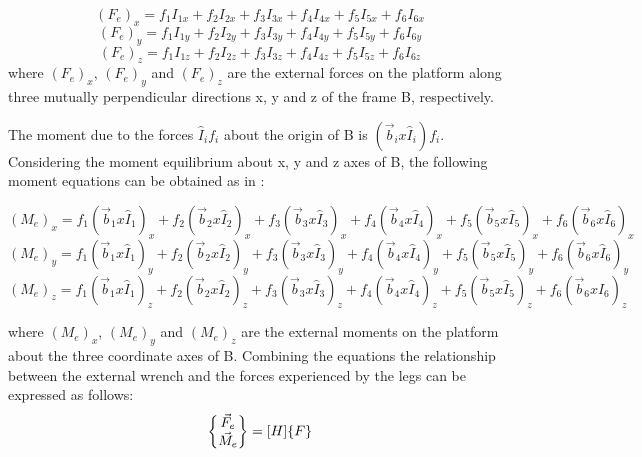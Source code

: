 \begin{equation}
	(F_e)_x = f_1I_{1x} + f_2I_{2x} + f_3I_{3x} + f_4I_{4x} + f_5I_{5x} + f_6I_{6x}
\end{equation}
\begin{equation}
	(F_e)_y = f_1I_{1y} + f_2I_{2y} + f_3I_{3y} + f_4I_{4y} + f_5I_{5y} + f_6I_{6y}
\end{equation}
\begin{equation}
	(F_e)_z = f_1I_{1z} + f_2I_{2z} + f_3I_{3z} + f_4I_{4z} + f_5I_{5z} + f_6I_{6z}
\end{equation}
where $(F_e)_x$, $(F_e)_y$ and $(F_e)_z$ are the external forces on the platform along three mutually perpendicular directions x, y and z of the frame B, respectively.

The moment due to the forces $\hat{I}_if_i$ about the origin of B is $(\vec{b}_i x \hat{I}_i)f_i$. Considering the moment equilibrium about x, y and z axes of B, the following moment equations can be obtained as in \cite{dwarakanath_design_2001}:

\begin{equation}
	(M_e)_x = f_1(\vec{b}_1 x \hat{I}_1)_x + f_2(\vec{b}_2 x \hat{I}_2)_x + f_3(\vec{b}_3 x \hat{I}_3)_x + f_4(\vec{b}_4 x \hat{I}_4)_x + f_5(\vec{b}_5 x \hat{I}_5)_x + f_6(\vec{b}_6 x \hat{I}_6)_x
\end{equation}
\begin{equation}
	(M_e)_y = f_1(\vec{b}_1 x \hat{I}_1)_y + f_2(\vec{b}_2 x \hat{I}_2)_y + f_3(\vec{b}_3 x \hat{I}_3)_y + f_4(\vec{b}_4 x \hat{I}_4)_y + f_5(\vec{b}_5 x \hat{I}_5)_y + f_6(\vec{b}_6 x \hat{I}_6)_y
\end{equation}
\begin{equation}
	(M_e)_z = f_1(\vec{b}_1 x \hat{I}_1)_z + f_2(\vec{b}_2 x \hat{I}_2)_z + f_3(\vec{b}_3 x \hat{I}_3)_z + f_4(\vec{b}_4 x \hat{I}_4)_z + f_5(\vec{b}_5 x \hat{I}_5)_z + f_6(\vec{b}_6 x \hat{I}_6)_z
\end{equation}

where $(M_e)_x$, $(M_e)_y$ and $(M_e)_z$ are the external moments on the platform  about the three coordinate axes of B. Combining the equations the relationship between the external wrench and the forces experienced by the legs can be expressed as follows:
\begin{equation}
	$$
\begin{Bmatrix}
	\vec{F}_e \\
	\vec{M}_e \\
\end{Bmatrix} = [H]\{F\}
$$
\end{equation}


